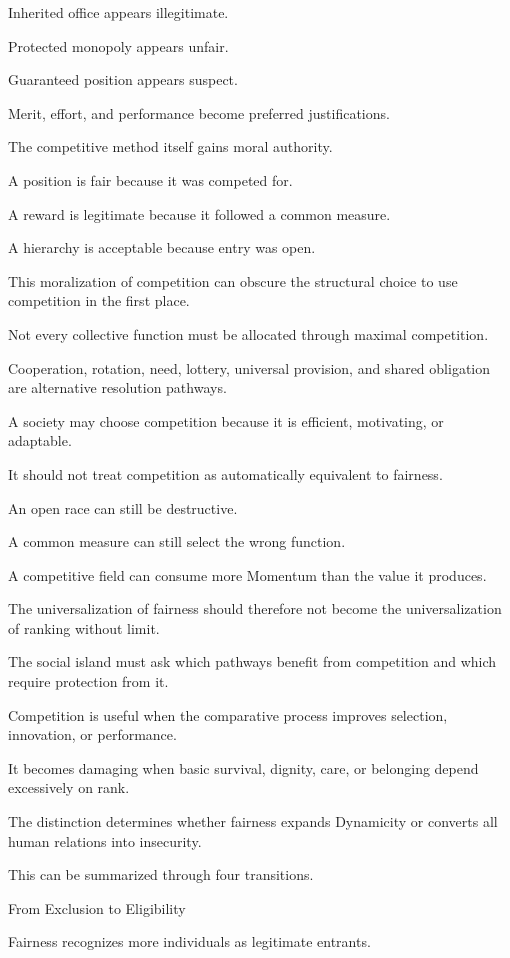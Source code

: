 Inherited office appears illegitimate.

Protected monopoly appears unfair.

Guaranteed position appears suspect.

Merit, effort, and performance become preferred justifications.

The competitive method itself gains moral authority.

A position is fair because it was competed for.

A reward is legitimate because it followed a common measure.

A hierarchy is acceptable because entry was open.

This moralization of competition can obscure the structural choice to use competition in the first place.

Not every collective function must be allocated through maximal competition.

Cooperation, rotation, need, lottery, universal provision, and shared obligation are alternative resolution pathways.

A society may choose competition because it is efficient, motivating, or adaptable.

It should not treat competition as automatically equivalent to fairness.

An open race can still be destructive.

A common measure can still select the wrong function.

A competitive field can consume more Momentum than the value it produces.

The universalization of fairness should therefore not become the universalization of ranking without limit.

The social island must ask which pathways benefit from competition and which require protection from it.

Competition is useful when the comparative process improves selection, innovation, or performance.

It becomes damaging when basic survival, dignity, care, or belonging depend excessively on rank.

The distinction determines whether fairness expands Dynamicity or converts all human relations into insecurity.

This can be summarized through four transitions.

From Exclusion to Eligibility

Fairness recognizes more individuals as legitimate entrants.

